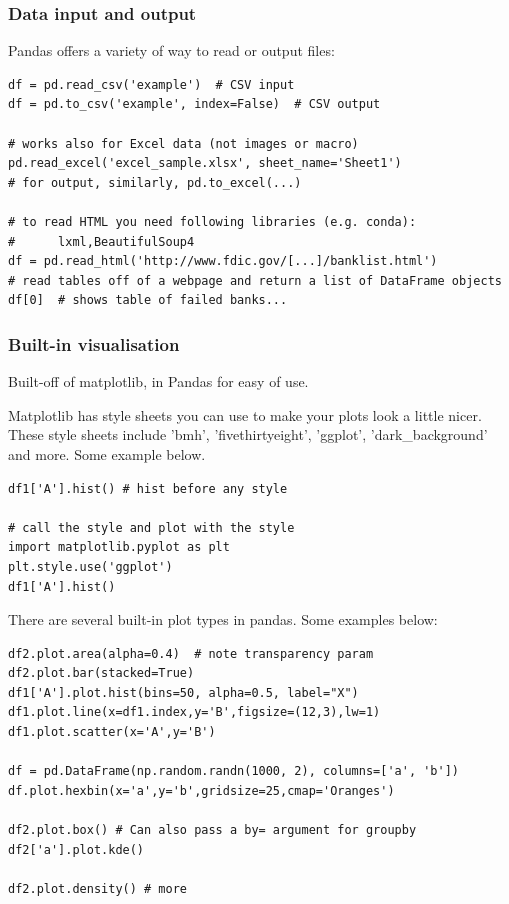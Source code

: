 \documentclass[12pt]{article}
\begin{document}
\subsubsection{Data input and output} 
Pandas offers a variety of way to read or output files:
\begin{lstlisting}
df = pd.read_csv('example')  # CSV input
df = pd.to_csv('example', index=False)  # CSV output

# works also for Excel data (not images or macro)            
pd.read_excel('excel_sample.xlsx', sheet_name='Sheet1') 
# for output, similarly, pd.to_excel(...)

# to read HTML you need following libraries (e.g. conda): 
#      lxml,BeautifulSoup4
df = pd.read_html('http://www.fdic.gov/[...]/banklist.html')  
# read tables off of a webpage and return a list of DataFrame objects
df[0]  # shows table of failed banks...
\end{lstlisting}

\subsubsection{Built-in visualisation}
Built-off of matplotlib, in Pandas for easy of use.

Matplotlib has style sheets you can use to make your plots look a little nicer. These style sheets include 'bmh', 'fivethirtyeight', 'ggplot', 'dark\_background' and more. Some example below.

\begin{lstlisting}
df1['A'].hist() # hist before any style

# call the style and plot with the style
import matplotlib.pyplot as plt
plt.style.use('ggplot')
df1['A'].hist()
\end{lstlisting}

There are several built-in plot types in pandas. Some examples below:
\begin{lstlisting}
df2.plot.area(alpha=0.4)  # note transparency param
df2.plot.bar(stacked=True)
df1['A'].plot.hist(bins=50, alpha=0.5, label="X")
df1.plot.line(x=df1.index,y='B',figsize=(12,3),lw=1)
df1.plot.scatter(x='A',y='B')

df = pd.DataFrame(np.random.randn(1000, 2), columns=['a', 'b'])
df.plot.hexbin(x='a',y='b',gridsize=25,cmap='Oranges')

df2.plot.box() # Can also pass a by= argument for groupby
df2['a'].plot.kde()

df2.plot.density() # more
\end{lstlisting}
\end{document}
